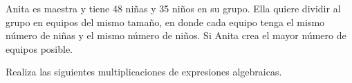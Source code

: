 \documentclass[11pt,addpoints]{exam}
\begin{document}

\begin{questions}
    
    \newpage

    
    \newpage
    
    
    
    \question[20] Anita es maestra y tiene 48 niñas y 35 niños en su grupo. Ella quiere dividir al grupo en equipos del mismo tamaño,
    en donde cada equipo tenga el mismo número de niñas y el mismo número de niños. Si Anita crea el mayor número de
    equipos posible.


    \question[20] Realiza las siguientes multiplicaciones de expresiones algebraicas.

    \begin{parts}
        

        
    \end{parts}
\end{questions}
\end{document}
